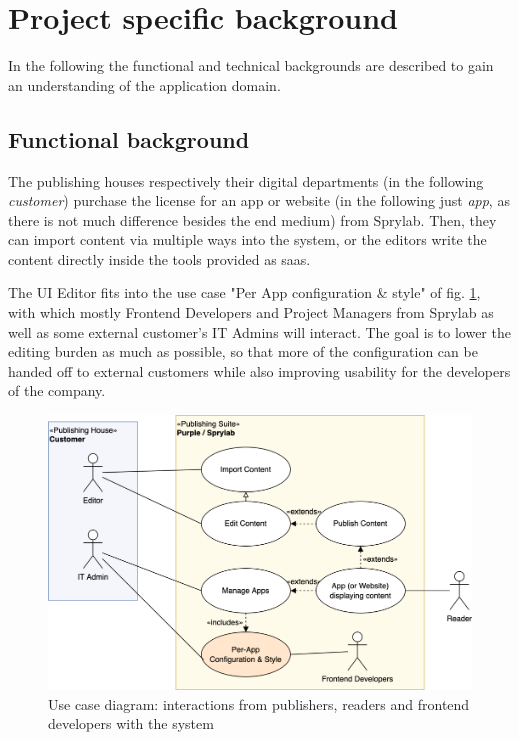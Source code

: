 \section{Project specific background}

In the following the functional and technical backgrounds are described to gain an understanding of the application domain.

\subsection{Functional background}

The publishing houses respectively their digital departments (in the following \textit{customer}) purchase the license for an app or website (in the following just \textit{app}, as there is not much difference besides the end medium) from Sprylab.
Then, they can import content via multiple ways into the system, or the editors write the content directly inside the tools provided as \Gls{saas}.

The UI Editor fits into the use case "Per App configuration \& style" of fig. \ref*{fig:usecase1}, with which mostly Frontend Developers and Project Managers from Sprylab as well as some external customer's IT Admins will interact. The goal is to lower the editing burden as much as possible, so that more of the configuration can be handed off to external customers while also improving usability for the developers of the company.

\begin{figure}[h!]
  \includegraphics[width=\textwidth]{pics/purple-abstract.drawio.png}
  \caption{Use case diagram: interactions from publishers, readers and frontend developers with the system}
  \label{fig:usecase1}
\end{figure}

